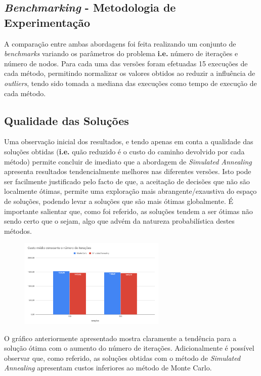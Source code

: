 \documentclass{article}
\begin{document}
\subsection{\textit{Benchmarking} - Metodologia de Experimentação}
A comparação entre ambas abordagens foi feita realizando um conjunto de \textit{benchmarks} variando os parâmetros do problema \textbf{i.e.} número de iterações e 
número de nodos. Para cada uma das versões foram efetuadas 15 execuções de cada método, permitindo normalizar os valores obtidos ao reduzir a influência de 
\textit{outliers}, tendo sido tomada a mediana das execuções como tempo de execução de cada método.

\subsection{Qualidade das Soluções}
Uma observação inicial dos resultados, e tendo apenas em conta a qualidade das soluções obtidas (\textbf{i.e.} quão reduzido é o custo do caminho devolvido por cada
método) permite concluir de imediato que a abordagem de \textit{Simulated Annealing} apresenta resultados tendencialmente melhores nas diferentes versões. Isto 
pode ser facilmente justificado pelo facto de que, a aceitação de decisões que não são localmente ótimas, permite uma exploração mais abrangente/exaustiva do espaço 
de soluções, podendo levar a soluções que são mais ótimas globalmente. É importante salientar que, como foi referido, as soluções tendem a ser ótimas não sendo
certo que o sejam, algo que advém da natureza probabilística destes métodos.

\begin{figure}[H]
    \centering
    \includegraphics[width=7cm]{Pictures/AvgCost.png}
\end{figure}

O gráfico anteriormente apresentado mostra claramente a tendência para a solução ótima com o aumento do número de iterações. Adicionalmente é possível observar que, como referido, as soluções obtidas com o método de \textit{Simulated Annealing} apresentam custos inferiores ao método de Monte Carlo.
\end{document}
